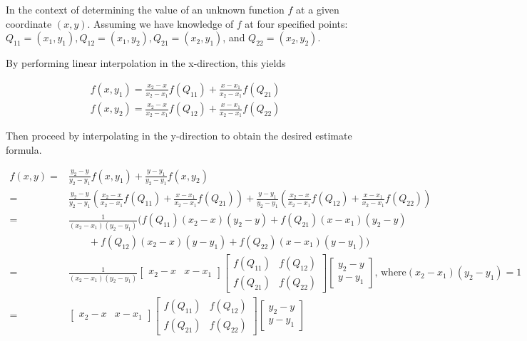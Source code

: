 \documentclass[a4paper, 12pt]{article}
\begin{document}
In the context of determining the value of an unknown function $f$ at a given coordinate $(x, y)$. Assuming we have knowledge of $f$ at four specified points: $Q_{11}=(x_1, y_1), Q_{12}=(x_1, y_2), Q_{21}=(x_2, y_1)$, and $Q_{22} = (x_2, y_2)$.

By performing linear interpolation in the x-direction, this yields

\begin{align*}
    f(x,y_{1})={\frac{x_{2}-x}{x_{2}-x_{1}}}f(Q_{11})+{\frac{x-x_{1}}{x_{2}-x_{1}}}f(Q_{21}) \\
    f(x,y_{2})={\frac{x_{2}-x}{x_{2}-x_{1}}}f(Q_{12})+{\frac{x-x_{1}}{x_{2}-x_{1}}}f(Q_{22})
\end{align*}

Then proceed by interpolating in the y-direction to obtain the desired estimate formula.

\begin{align*}
    f(x,y)= & {\frac {y_{2}-y}{y_{2}-y_{1}}}f(x,y_{1})+{\frac {y-y_{1}}{y_{2}-y_{1}}}f(x,y_{2})                                                                                                                                                                     \\
    =       & {\frac {y_{2}-y}{y_{2}-y_{1}}}\left({\frac {x_{2}-x}{x_{2}-x_{1}}}f(Q_{11})+{\frac {x-x_{1}}{x_{2}-x_{1}}}f(Q_{21})\right)+{\frac {y-y_{1}}{y_{2}-y_{1}}}\left({\frac {x_{2}-x}{x_{2}-x_{1}}}f(Q_{12})+{\frac {x-x_{1}}{x_{2}-x_{1}}}f(Q_{22})\right) \\
    =       & {\frac {1}{(x_{2}-x_{1})(y_{2}-y_{1})}}\bigl(f(Q_{11})(x_{2}-x)(y_{2}-y)+f(Q_{21})(x-x_{1})(y_{2}-y)                                                                                                                                                  \\
            & \quad \quad+f(Q_{12})(x_{2}-x)(y-y_{1})+f(Q_{22})(x-x_{1})(y-y_{1})\bigr)                                                                                                                                                                             \\
    =       & {\frac {1}{(x_{2}-x_{1})(y_{2}-y_{1})}}{\begin{bmatrix}x_{2}-x&x-x_{1}\end{bmatrix}}{\begin{bmatrix}f(Q_{11})&f(Q_{12})\\f(Q_{21})&f(Q_{22})\end{bmatrix}}{\begin{bmatrix}y_{2}-y\\y-y_{1}\end{bmatrix}}\text{, where}(x_2-x_1)(y_2-y_1)=1            \\
    =       & {\begin{bmatrix}x_{2}-x&x-x_{1}\end{bmatrix}}{\begin{bmatrix}f(Q_{11})&f(Q_{12})\\f(Q_{21})&f(Q_{22})\end{bmatrix}}{\begin{bmatrix}y_{2}-y\\y-y_{1}\end{bmatrix}}
\end{align*}
\end{document}
